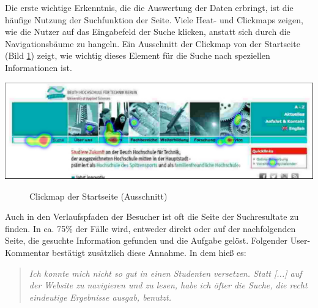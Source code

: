 Die erste wichtige Erkenntnis, die die Auswertung der Daten erbringt, ist die häufige Nutzung der Suchfunktion der Seite. Viele Heat- und Clickmaps zeigen, wie die Nutzer auf das Eingabefeld der Suche klicken, anstatt sich durch die Navigationsbäume zu hangeln. Ein Ausschnitt der Clickmap von der Startseite (Bild \ref{clickmapSearch}) zeigt, wie wichtig dieses Element für die Suche nach speziellen Informationen ist.
\\
\begin{center}
\includegraphics[scale=0.52]{./images/clickmap-search}
\end{center}
\begin{figure}[htb]
   \centering
   \caption{Clickmap der Startseite (Ausschnitt)}
    \label{clickmapSearch}
\end{figure}

Auch in den Verlaufspfaden der Besucher ist oft die Seite der Suchresultate zu finden. In ca. 75\% der Fälle wird, entweder direkt oder auf der nachfolgenden Seite, die gesuchte Information gefunden und die Aufgabe gelöst. Folgender User-Kommentar bestätigt zusätzlich diese Annahme. In dem hieß es:

\begin{quote}
     \glqq \textit{Ich konnte mich nicht so gut in einen Studenten versetzen. Statt [...] auf der Website zu navigieren und zu lesen, habe ich öfter die Suche, die recht eindeutige Ergebnisse ausgab, benutzt.}\grqq{}
\end{quote}

